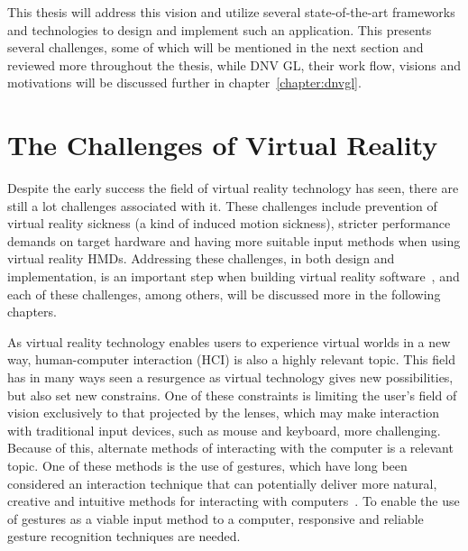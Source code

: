 This thesis will address this vision and utilize several state-of-the-art frameworks and technologies to design and implement such 
an application. This presents several challenges, some of which will be mentioned in the next section and reviewed more throughout the thesis, while 
DNV GL, their work flow, visions and motivations will be discussed further in chapter~\ref{chapter:dnvgl}. 


\section{The Challenges of Virtual Reality} 
Despite the early success the field of virtual reality technology has seen, there are still a lot challenges associated with it. 
These challenges include prevention of virtual reality sickness (a kind of induced motion sickness), 
stricter performance demands on target hardware and having more suitable input methods when using virtual reality HMDs. %
Addressing these challenges, in both design and implementation, is an important step when building virtual reality software~\citep{OCULUS2016}, 
and each of these challenges, among others, will be discussed more in the following chapters.

As virtual reality technology enables users to experience virtual worlds in a new way, 
human-computer interaction (HCI) is also a highly relevant topic. 
This field has in many ways seen a resurgence as virtual technology gives new possibilities, but also set new constrains. 
One of these constraints is limiting the user's field of vision exclusively to that projected by the lenses, 
which may make interaction with traditional input devices, such as mouse and keyboard, more challenging. 
Because of this, alternate methods of interacting with the computer is a relevant topic. 
One of these methods is the use of gestures, 
which have long been considered an interaction technique that can potentially deliver more natural, 
creative and intuitive methods for interacting with computers~\citep{Rautaray2015}. 
To enable the use of gestures as a viable input method to a computer, responsive and reliable gesture recognition techniques are needed.  


